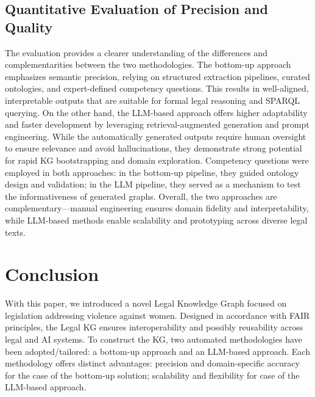 \documentclass[runningheads]{llncs}
\begin{document}
\subsection{Quantitative Evaluation of Precision and Quality}
The evaluation provides a clearer understanding of the differences and complementarities between the two methodologies. The bottom-up approach emphasizes semantic precision, relying on structured extraction pipelines, curated ontologies, and expert-defined competency questions. This results in well-aligned, interpretable outputs that are suitable for formal legal reasoning and SPARQL querying. On the other hand, the LLM-based approach offers higher adaptability and faster development by leveraging retrieval-augmented generation and prompt engineering. While the automatically generated outputs require human oversight to ensure relevance and avoid hallucinations, they demonstrate strong potential for rapid KG bootstrapping and domain exploration. Competency questions were employed in both approaches: in the bottom-up pipeline, they guided ontology design and validation; in the LLM pipeline, they served as a mechanism to test the informativeness of generated graphs. Overall, the two approaches are complementary—manual engineering ensures domain fidelity and interpretability, while LLM-based methods enable scalability and prototyping across diverse legal texts.


\section{Conclusion}\label{conc}
With this paper, we %
introduced a novel %
Legal Knowledge Graph focused on legislation addressing violence against women. %
Designed in accordance with FAIR principles, the Legal KG ensures interoperability and possibly reusability across legal and AI systems. %
To construct the KG, two automated methodologies have been adopted/tailored: a %
bottom-up approach and an %
LLM-based approach. Each methodology offers distinct advantages: precision and domain-specific accuracy for the case of the bottom-up solution; scalability and flexibility for case of the LLM-based approach. %
\end{document}
